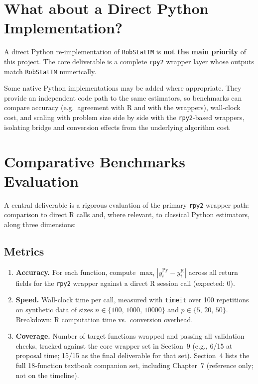 \documentclass[11pt, a4paper]{article}
\begin{document}
\section{What about a Direct Python Implementation?}

A direct Python re-implementation of \texttt{RobStatTM} is \textbf{not the main
priority} of this project. The core deliverable is a complete \texttt{rpy2}
wrapper layer whose outputs match \texttt{RobStatTM} numerically.

Some native Python implementations may be added where appropriate. They provide
an independent code path to the same estimators, so benchmarks can compare
accuracy (e.g.\ agreement with R and with the wrappers), wall-clock cost, and
scaling with problem size side by side with the \texttt{rpy2}-based wrappers,
isolating bridge and conversion effects from the underlying algorithm cost.

\section{Comparative Benchmarks Evaluation}
\label{sec:evaluation}

A central deliverable is a rigorous evaluation of the primary
\texttt{rpy2} wrapper path: comparison to direct R calls and, where
relevant, to classical Python estimators, along three dimensions:

\subsection{Metrics}

\begin{enumerate}[leftmargin=2em]
  \item \textbf{Accuracy.}
    For each function, compute $\max_i |y_i^{\text{Py}} - y_i^{\text{R}}|$
    across all return fields for the \texttt{rpy2} wrapper against a direct
    R session call (expected: $0$).
  \item \textbf{Speed.}
    Wall-clock time per call, measured with \texttt{timeit} over 100
    repetitions on synthetic data of sizes $n \in \{100,\,1000,\,10000\}$
    and $p \in \{5,\,20,\,50\}$.
    Breakdown: R computation time vs.\ conversion overhead.
  \item \textbf{Coverage.}
    Number of target functions wrapped and passing all validation checks,
    tracked against the core wrapper set in Section~9
    (e.g., 6/15 at proposal time; 15/15 as the final deliverable for that set).
    Section~4 lists the full 18-function textbook companion set, including
    Chapter~7 (reference only; not on the timeline).
\end{enumerate}
\end{document}
